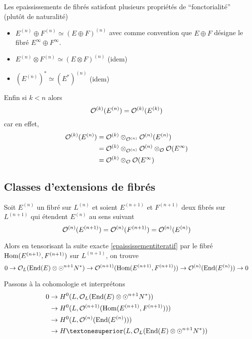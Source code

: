 \documentclass[a4paper]{amsart}
\begin{document}
Les epaississements de fibrés satisfont plusieurs propriétés de ``fonctorialité'' (plutôt de naturalité)

\begin{itemize}
\item $E^{(n)} \oplus F^{(n)} \simeq (E \oplus F)^{(n)}$ avec comme convention que $E \oplus F$ désigne le fibré $E^\infty \oplus F^\infty$.
\item $E^{(n)} \otimes F^{(n)} \simeq (E \otimes F)^{(n)}$ (idem)
\item $\left(E^{(n)}\right)^* \simeq (E^*)^{(n)}$ (idem)
\end{itemize}

Enfin si $k < n$ alors
\begin{equation}
\mathcal{O}^{(k)}(E^{(n)}) = \mathcal{O}^{(k)}(E^{(k)})
\end{equation}
car en effet, 
\begin{align*}
\mathcal{O}^{(k)}(E^{(n)}) &= \mathcal{O}^{(k)}\otimes_{\mathcal{O}^{(n)}}\mathcal{O}^{(n)}(E^{(n)}) \\
                   &= \mathcal{O}^{(k)}\otimes_{\mathcal{O}^{(n)}}\mathcal{O}^{(n)} \otimes_{\mathcal{O}} \mathcal{O}(E^\infty)\\
                   &= \mathcal{O}^{(k)}\otimes_{\mathcal{O}}\mathcal{O}(E^\infty)
\end{align*}
\subsection{Classes d'extensions de fibrés}
\label{sec-3-2}

Soit $E^{(n)}$ un fibré sur $L^{(n)}$ et soient $E^{(n+1)}$ et $F^{(n+1)}$ deux fibrés sur $L^{(n+1)}$ qui étendent $E^{(n)}$ au sens suivant
\[
\mathcal{O}^{(n)}(E^{(n+1)}) = \mathcal{O}^{(n)}(F^{(n+1)}) = \mathcal{O}^{(n)}(E^{(n)})
\]

Alors en tensorisant la suite exacte \eqref{epaississementiteratif} par le fibré $\text{Hom}(E^{(n+1)}, F^{(n+1)})$ sur $L^{(n+1)}$, on trouve
\begin{equation*}
0 \to \mathcal{O}_L(\text{End}(E) \otimes \odot^{n+1}N^*)
  \to \mathcal{O}^{(n+1)}(\text{Hom}(E^{(n+1)},F^{(n+1)}))
  \to \mathcal{O}^{(n)}(\text{End}(E^{(n)}))
  \to 0
\end{equation*}

Passons à la cohomologie et interprétons
\begin{align*}
0 &\to H^0(L,\Oo_L(\End(E) \otimes \odot^{n+1}N^*))\\
  &\to H^0(L,\Oo^{(n+1)}(\Hom(E^{(n+1)},F^{(n+1)})))\\
  &\to H^0(L,\Oo^{(n)}(\End(E^{(n)})))\\
  &\to H¹(L,\Oo_L(\End(E) \otimes \odot^{n+1}N^*))
\end{align*}
\end{document}
